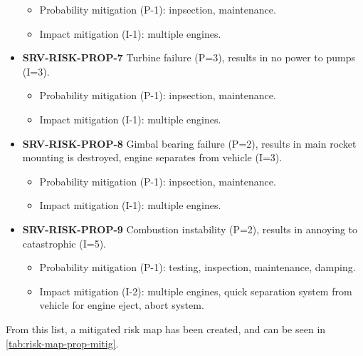 \begin{itemize}
	\begin{itemize}
		 \item Probability mitigation (P-1): inpsection, maintenance.		 \item Impact mitigation (I-1): multiple engines.	\end{itemize}
	 \item \textbf{SRV-RISK-PROP-7} Turbine failure (P=3), results in no power to pumps (I=3).
	\begin{itemize}
		 \item Probability mitigation (P-1): inpsection, maintenance.		 \item Impact mitigation (I-1): multiple engines.	\end{itemize}
	 \item \textbf{SRV-RISK-PROP-8} Gimbal bearing failure (P=2), results in main rocket mounting is destroyed, engine separates from vehicle (I=3).
	\begin{itemize}
		 \item Probability mitigation (P-1): inpsection, maintenance.		 \item Impact mitigation (I-1): multiple engines.	\end{itemize}
	 \item \textbf{SRV-RISK-PROP-9} Combustion instability (P=2), results in annoying to catastrophic (I=5).
	\begin{itemize}
		 \item Probability mitigation (P-1): testing, inspection, maintenance, damping.		 \item Impact mitigation (I-2): multiple engines, quick separation system from vehicle for engine eject, abort system.	\end{itemize}
\end{itemize}

\noindent From this list, a mitigated risk map has been created, and can be seen in \autoref{tab:risk-map-prop-mitig}.

